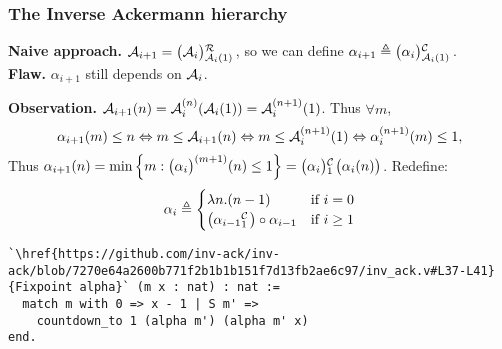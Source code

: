 \begin{frame}[fragile]
\frametitle{The Inverse Ackermann hierarchy}
\textbf{Naive approach.} $\Ack_{i+1} = \rf{\big(\Ack_i\big)}{\Ack_i(1)}\ $, so we can define $\alpha_{i+1} \triangleq \cdt{\big(\alpha_i\big)}{\Ack_i(1)}\ $.\\ \smallskip
\textbf{Flaw.} $\alpha_{i+1}$ still depends on $\mathcal{A}_i$.

\bigskip

\textbf{Observation.} $\mathcal{A}_{i+1}(n) = \mathcal{A}_i^{(n)}(\mathcal{A}_i(1)) = \mathcal{A}_i^{(n+1)}(1)$. Thus $\forall m$,
\vspace{-0.7em}
\begin{equation*}
\alpha_{i+1}(m) \le n \Leftrightarrow m \le \mathcal{A}_{i+1}(n) \Leftrightarrow m \le \mathcal{A}_i^{(n+1)}(1)
\Leftrightarrow \alpha_i^{(n+1)}(m) \le 1,
\end{equation*}
Thus $\alpha_{i+1}(n) = \min\left\{m : \big( \alpha_i \big)^{(m+1)}(n)\le 1\right\} = \cdt{\big(\alpha_i\big)}{1}\big(\alpha_i(n)\big)$. Redefine:
\vspace{-1em}
\begin{equation*}
\alpha_i \triangleq
\begin{cases}
\lambda n.(n - 1) & \text{if } i = 0
\\ \big(\cdt{\alpha_{i-1}}{1}\big)\circ \alpha_{i-1} & \text{if } i\ge 1
\end{cases}
\end{equation*}
\vspace{-1em}
\begin{lstlisting}
`\href{https://github.com/inv-ack/inv-ack/blob/7270e64a2600b771f2b1b1b151f7d13fb2ae6c97/inv_ack.v#L37-L41}{Fixpoint alpha}` (m x : nat) : nat :=
  match m with 0 => x - 1 | S m' =>
    countdown_to 1 (alpha m') (alpha m' x)
end.
\end{lstlisting}
\end{frame}